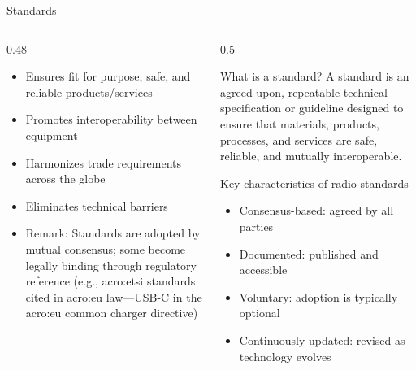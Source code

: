 \begin{frame}{Standards}
  \begin{columns}[onlytextwidth]
    \begin{column}{0.48\textwidth}
      \begin{itemize}
        \item Ensures fit for purpose, safe, and reliable products/services
        \item Promotes interoperability between equipment
        \item Harmonizes trade requirements across the globe
        \item Eliminates technical barriers
        \item \alert{Remark:} Standards are adopted by mutual consensus; some become legally binding through regulatory reference (e.g., \gls{acro:etsi} standards cited in \gls{acro:eu} law---USB-C in the \gls{acro:eu} common charger directive)
      \end{itemize}
    \end{column}
    \begin{column}{0.5\textwidth}
      \begin{block}{What is a standard?}
        A standard is an agreed-upon, repeatable technical specification or guideline designed to ensure that materials, products, processes, and services are safe, reliable, and mutually interoperable.
      \end{block}
      \begin{block}{Key characteristics of radio standards}
        \begin{itemize}
          \item Consensus-based: agreed by all parties
          \item Documented: published and accessible
          \item Voluntary: adoption is typically optional
          \item Continuously updated: revised as technology evolves
        \end{itemize}
      \end{block}
    \end{column}
  \end{columns}
\end{frame}


